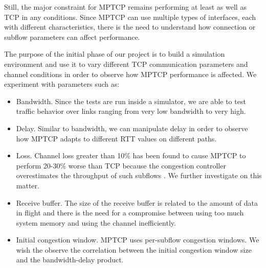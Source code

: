 Still, the major constraint for MPTCP remains performing at least as well as TCP in any conditions. Since MPTCP can use multiple types of interfaces, each with different characteristics, there is the need to understand how connection or subflow parameters can affect performance.

The purpose of the initial phase of our project is to build a simulation environment and use it to vary different TCP communication parameters and channel conditions in order to observe how MPTCP performance is affected. We experiment with parameters such as:
\begin{itemize}
\item Bandwidth. Since the tests are run inside a simulator, we are able to test traffic behavior over links ranging from very low bandwidth to very high.
\item Delay. Similar to bandwidth, we can manipulate delay in order to observe how MPTCP adapts to different RTT values on different paths.
\item Loss. Channel loss greater than 10\% has been found to cause MPTCP to
perform 20-30\% worse than TCP because the congestion controller overestimates
the throughput of such subflows \cite{how-hard-can-it-be}. We further investigate on this matter.
\item Receive buffer. The size of the receive buffer is related to the amount
of data in flight and there is the need for a compromise between using too
much system memory and using the channel inefficiently.
\item Initial congestion window. MPTCP uses per-subflow congestion windows.
We wish the observe the correlation between the initial congestion window
size and the bandwidth-delay product.
\end{itemize}
